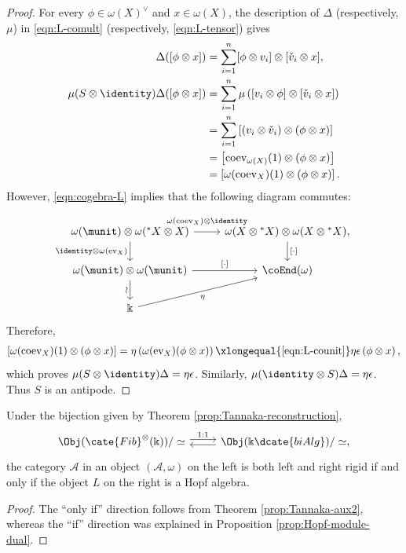 \begin{proof}
	For every $\phi \in \omega(X)^\vee$ and $x \in \omega(X)$, the
	description of $\Delta$ (respectively, $\mu$) in
	\eqref{eqn:L-comult} (respectively, \eqref{eqn:L-tensor}) gives
	\begin{align*}
		\Delta([\phi \otimes x]) & = \sum_{i=1}^n [\phi \otimes v_i] \otimes [\check{v}_i \otimes x], \\
		\mu(S \otimes \identity)\Delta([\phi \otimes x]) & = \sum_{i=1}^n \mu\left( [v_i \otimes \phi] \otimes [\check{v}_i \otimes x] \right) \\
		& = \sum_{i=1}^n \left[ (v_i \otimes \check{v}_i) \otimes (\phi \otimes x) \right] \\
		& = \left[ \mathrm{coev}_{\omega(X)}(1) \otimes (\phi \otimes x) \right] \\
		& = \left[ \omega(\mathrm{coev}_X)(1) \otimes (\phi \otimes x) \right].
	\end{align*}
	However, \eqref{eqn:cogebra-L} implies that the following diagram
	commutes:
	\[\begin{tikzcd}
		\omega(\munit) \otimes \omega({}^* X \otimes X) \arrow[r, "{\omega(\mathrm{coev}_X) \otimes \identity}" inner sep=0.6em] \arrow[d, "{\identity \otimes \omega(\mathrm{ev}_X)}"'] & \omega(X \otimes {}^* X) \otimes \omega(X \otimes {}^* X), \arrow[d, "{[\cdot]}"] \\
		\omega(\munit) \otimes \omega(\munit) \arrow[d, "\sim"' sloped] \arrow[r, "{[\cdot]}"] & \coEnd(\omega) \\
		\Bbbk \arrow[ru, "\eta"'] & 
	\end{tikzcd}\]
	Therefore,
	\begin{gather*}
		\left[ \omega(\mathrm{coev}_X)(1) \otimes (\phi \otimes x) \right]
		= \eta\left( \omega(\mathrm{ev}_X)(\phi \otimes x) \right)
		\xlongequal{\text{\eqref{eqn:L-counit}}} \eta\epsilon\left( \phi \otimes x \right),
	\end{gather*}
	which proves $\mu(S \otimes \identity)\Delta = \eta\epsilon$.
	Similarly, $\mu(\identity \otimes S)\Delta = \eta\epsilon$. Thus $S$ is
	an antipode.
\end{proof}

\begin{corollary}\label{prop:Hopf-vs-dual}
	Under the bijection given by Theorem
	\ref{prop:Tannaka-reconstruction},
	\[\begin{tikzcd}
		\Obj(\cate{Fib}^{\otimes}(\Bbbk))/\simeq \arrow[shift left, r, "{1:1}"] & \Obj(\Bbbk\dcate{biAlg}) /\simeq , \arrow[shift left, l]
	\end{tikzcd}\]
	the category $\mathcal{A}$ in an object $(\mathcal{A}, \omega)$ on the
	left is both left and right rigid if and only if the object $L$ on the
	right is a Hopf algebra.
\end{corollary}
\begin{proof}
	The ``only if'' direction follows from Theorem \ref{prop:Tannaka-aux2},
	whereas the ``if'' direction was explained in Proposition
	\ref{prop:Hopf-module-dual}.
\end{proof}

